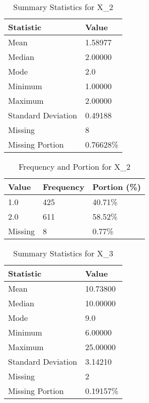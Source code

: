 \begin{table}[H]
\centering
\begin{tabular}{|l|l|}
\hline
\textbf{Statistic} & \textbf{Value} \\ \hline
Mean               & 1.58977 \\ \hline
Median             & 2.00000 \\ \hline
Mode               & 2.0 \\ \hline
Minimum            & 1.00000 \\ \hline
Maximum            & 2.00000 \\ \hline
Standard Deviation & 0.49188 \\ \hline
Missing            & 8 \\ \hline
Missing Portion    & 0.76628\% \\ \hline
\end{tabular}
\caption{Summary Statistics for X_2}
\end{table}

\begin{table}[H]
\centering
\begin{tabular}{|l|l|l|}
\hline
\textbf{Value} & \textbf{Frequency} & \textbf{Portion (\%)} \\ \hline
1.0 & 425 & 40.71\% \\ \hline
2.0 & 611 & 58.52\% \\ \hline
Missing & 8 & 0.77\% \\ \hline
\end{tabular}
\caption{Frequency and Portion for X_2}
\end{table}

\begin{table}[H]
\centering
\begin{tabular}{|l|l|}
\hline
\textbf{Statistic} & \textbf{Value} \\ \hline
Mean               & 10.73800 \\ \hline
Median             & 10.00000 \\ \hline
Mode               & 9.0 \\ \hline
Minimum            & 6.00000 \\ \hline
Maximum            & 25.00000 \\ \hline
Standard Deviation & 3.14210 \\ \hline
Missing            & 2 \\ \hline
Missing Portion    & 0.19157\% \\ \hline
\end{tabular}
\caption{Summary Statistics for X_3}
\end{table}


